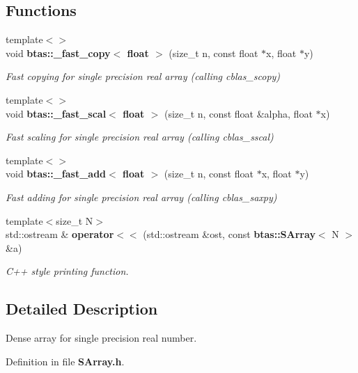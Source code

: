 \subsection*{Functions}
\begin{DoxyCompactItemize}
\item 
{\footnotesize template$<$$>$ }\\void {\bf btas\-::\-\_\-fast\-\_\-copy$<$ float $>$} (size\-\_\-t n, const float $\ast$x, float $\ast$y)
\begin{DoxyCompactList}\small\item\em Fast copying for single precision real array (calling cblas\-\_\-scopy) \end{DoxyCompactList}\item 
{\footnotesize template$<$$>$ }\\void {\bf btas\-::\-\_\-fast\-\_\-scal$<$ float $>$} (size\-\_\-t n, const float \&alpha, float $\ast$x)
\begin{DoxyCompactList}\small\item\em Fast scaling for single precision real array (calling cblas\-\_\-sscal) \end{DoxyCompactList}\item 
{\footnotesize template$<$$>$ }\\void {\bf btas\-::\-\_\-fast\-\_\-add$<$ float $>$} (size\-\_\-t n, const float $\ast$x, float $\ast$y)
\begin{DoxyCompactList}\small\item\em Fast adding for single precision real array (calling cblas\-\_\-saxpy) \end{DoxyCompactList}\item 
{\footnotesize template$<$size\-\_\-t N$>$ }\\std\-::ostream \& {\bf operator$<$$<$} (std\-::ostream \&ost, const {\bf btas\-::\-S\-Array}$<$ N $>$ \&a)
\begin{DoxyCompactList}\small\item\em C++ style printing function. \end{DoxyCompactList}\end{DoxyCompactItemize}


\subsection{Detailed Description}
Dense array for single precision real number. 

Definition in file {\bf S\-Array.\-h}.



